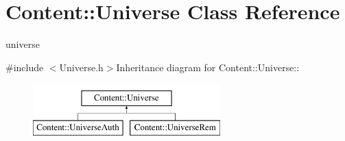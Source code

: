 \hypertarget{classContent_1_1Universe}{
\section{Content::Universe Class Reference}
\label{classContent_1_1Universe}
}


universe  


{\ttfamily \#include $<$Universe.h$>$}Inheritance diagram for Content::Universe::\begin{figure}[H]
\begin{center}
\leavevmode
\includegraphics[height=2cm]{classContent_1_1Universe}
\end{center}
\end{figure}
